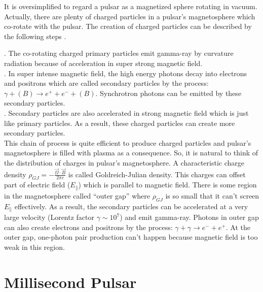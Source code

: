 \documentclass[12pt]{report}
\begin{document}
              It is oversimplified to regard a pulsar as a magnetized sphere rotating in vacuum. Actually,
              there are plenty of 
              charged particles in a pulsar's magnetosphere which co-rotate with the pulsar. The creation of 
              charged particles can 
              be described by the following steps \cite{Sturrock:1971zc}.

              . The co-rotating charged primary particles emit gamma-ray by curvature radiation 
              because of acceleration in super strong magnetic field.  \\
              . In super intense magnetic field,  the high energy photons decay into electrons and 
              positrons which are called secondary particles by the process: 
              $\gamma + (B) \rightarrow e^++e^-+(B)$. Synchrotron 
                                  photons can be emitted by these secondary particles. \\
              . Secondary particles are also accelerated in strong magnetic field which is just like 
              primary particles. As a result, these charged particles can create more secondary particles. \\
              \indent This chain of process is quite efficient to produce charged particles and pulsar's 
              magnetosphere is filled with plasma as a consequence. So, it is natural to think of the 
              distribution of charges in pulsar's magnetosphere. A characteristic charge density 
              $\rho_{GJ}=-\frac{\vec{\Omega}\cdot \vec{B}}{2\pi c}$ is called Goldreich-Julian density. 
              This charges can offset part of electric field ($E_{\parallel}$) which is parallel to magnetic 
              field. There is some region in the magnetosphere called ``outer gap'' where $\rho_{GJ}$ is so 
              small that it can't screen $E_{\parallel}$ effectively. As a result, the secondary particles can 
              be accelerated at a very large velocity (Lorentz factor $\gamma\sim 10^7$) and emit gamma-ray. 
              Photons in outer gap can also create electrons and positrons by the process: 
              $\gamma+\gamma\rightarrow e^-+e^+$. At the outer gap, one-photon pair production can't happen 
              because magnetic field is too weak in this region.
 
    \section{Millisecond Pulsar} 
\end{document}
